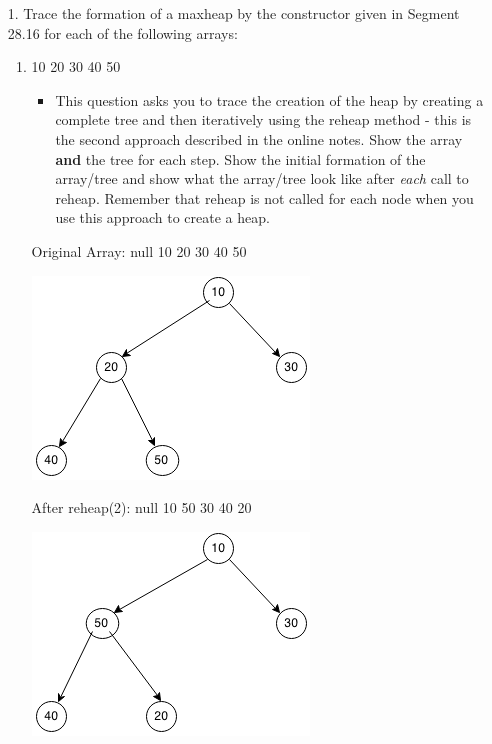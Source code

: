 \documentclass[10pt]{article}
\begin{document}
\begin{enumerate}
	\item[1.] Trace the formation of a maxheap by the constructor given in Segment 28.16 for each of the following arrays:
		\begin{enumerate}
			\item 10 20 30 40 50
				\begin{itemize}
					\item This question asks you to trace the creation of the heap by creating a complete tree and then iteratively using the reheap method - this is the second approach described in the online notes. Show the array \textbf{and} the tree for each step. Show the initial formation of the array/tree and show what the array/tree look like after \textit{each} call to reheap. Remember that reheap is not called for each node when you use this approach to create a heap.
				\end{itemize}
				
				\vspace{0.5cm}
				Original Array: null 10 20 30 40 50
				
				\vspace{0.5cm}
				\includegraphics[scale=0.5]{images/28_1_1.png}
				
				\vspace{0.5cm}
				After reheap(2): null 10 50 30 40 20
				
				\vspace{0.5cm}
				\includegraphics[scale=0.5]{images/28_1_2.png}
				

\end{enumerate}
\end{enumerate}
\end{document}
